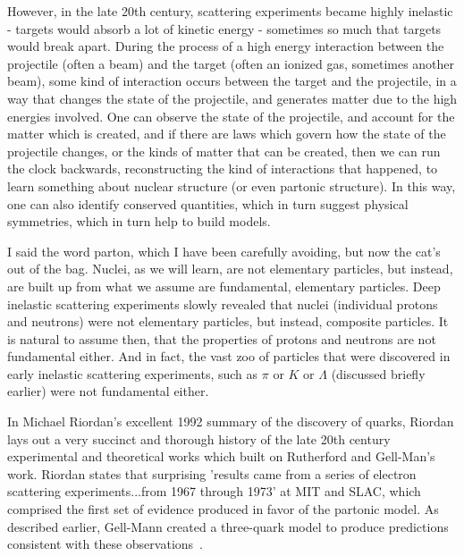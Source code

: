 However, in the late 20th century, scattering experiments became highly
inelastic - targets would absorb a lot of kinetic energy - sometimes so much
that targets would break apart.  During the process of a high energy interaction
between the projectile (often a beam) and the target (often an ionized gas,
sometimes another beam), some kind of interaction occurs between the target and
the projectile, in a way that changes the state of the projectile, and generates
matter due to the high energies involved. One can observe the state of the
projectile, and account for the matter which is created, and if there are laws
which govern how the state of the projectile changes, or the kinds of matter
that can be created, then we can run the clock backwards, reconstructing the
kind of interactions that happened, to learn something about nuclear structure
(or even partonic structure). In this way, one can also identify conserved
quantities, which in turn suggest physical symmetries, which in turn help to
build models.

I said the word parton, which I have been carefully avoiding, but now the cat's
out of the bag. Nuclei, as we will learn, are not elementary particles, but
instead, are built up from what we assume are fundamental, elementary particles.
Deep inelastic scattering experiments slowly revealed that nuclei (individual
protons and neutrons) were not elementary particles, but instead, composite
particles. It is natural to assume then, that the properties of protons and
neutrons are not fundamental either. And in fact, the vast zoo of particles that
were discovered in early inelastic scattering experiments, such as $\pi$ or $K$
or $\Lambda$ (discussed briefly earlier) were not fundamental either.

In Michael Riordan's excellent 1992 summary of the discovery of quarks, Riordan
lays out a very succinct and thorough history of the late 20th century
experimental and theoretical works which built on Rutherford and Gell-Man's
work. Riordan states that surprising 'results came from a
series of electron scattering experiments...from 1967 through 1973' at MIT and
SLAC, which comprised the first set of evidence produced in favor of the
partonic model. As described earlier, Gell-Mann created a three-quark model to
produce predictions consistent with these observations~\cite{Riordan1992}.

